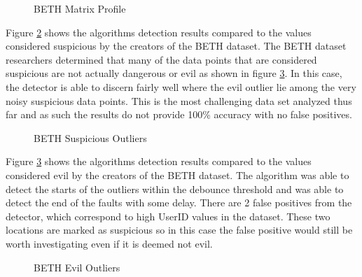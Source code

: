 \begin{figure}[H]
    
    \caption{BETH Matrix Profile}
    \label{fig:beth_mp_hist}
\end{figure}

Figure \ref{fig:beth_sus_outliers} shows the algorithms detection results compared to the values considered suspicious by the creators of the BETH dataset. The BETH dataset researchers determined that many of the data points that are considered suspicious are not actually dangerous or evil as shown in figure \ref{fig:beth_evil_outliers}. In this case, the detector is able to discern fairly well where the evil outlier lie among the very noisy suspicious data points. This is the most challenging data set analyzed thus far and as such the results do not provide 100\% accuracy with no false positives.

 \begin{figure}[H]
    
    \caption{BETH Suspicious Outliers}
    \label{fig:beth_sus_outliers}
\end{figure}

Figure \ref{fig:beth_evil_outliers} shows the algorithms detection results compared to the values considered evil by the creators of the BETH dataset. The algorithm was able to detect the starts of the outliers within the debounce threshold and was able to detect the end of the faults with some delay. There are 2 false positives from the detector, which correspond to high UserID values in the dataset. These two locations are marked as suspicious so in this case the false positive would still be worth investigating even if it is deemed not evil.
 
\begin{figure}[H]
    
    \caption{BETH Evil Outliers}
    \label{fig:beth_evil_outliers}
\end{figure}

